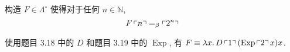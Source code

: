 \begin{problem}
构造 $F \in \Lambda^\circ$ 使得对于任何 $n \in \mathbb{N}$,
\[
F\left\ulcorner n \right\urcorner =_\beta \left\ulcorner 2^n \right\urcorner
\]
\end{problem}

\begin{solution}
使用题目 3.18 中的 $D$ 和题目 3.19 中的 $\operatorname{Exp}$, 有 $F \equiv \lambda {x}.\,{D \left\ulcorner 1 \right\urcorner (\operatorname{Exp} \left\ulcorner 2 \right\urcorner x) x}$.
\end{solution}
